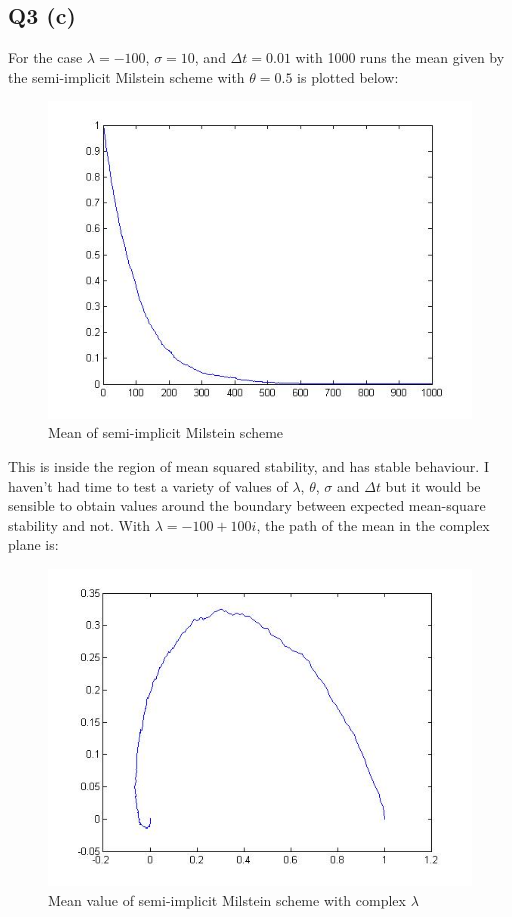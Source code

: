 \documentclass[11pt]{article} %
\begin{document}
\subsection{Q3 (c)}
For the case $\lambda = -100$, $\sigma = 10$, and $\Delta t = 0.01$ with 1000 runs the mean given by the semi-implicit Milstein scheme with $\theta = 0.5$ is plotted below:
\begin{figure}
	\centering
		\includegraphics[scale = 0.5]{q3_meanX}
		\caption{Mean of semi-implicit Milstein scheme}
\end{figure}
This is inside the region of mean squared stability, and has stable behaviour. I haven't had time to test a variety of values of $\lambda$, $\theta$, $\sigma$ and $\Delta t$ but it would be sensible to obtain values around the boundary between expected mean-square stability and not. With $\lambda = -100 + 100i$, the path of the mean in the complex plane is:
\begin{figure}
	\centering
		\includegraphics[scale = 0.5]{q3_meanCom}
		\caption{Mean value of semi-implicit Milstein scheme with complex $\lambda$}
\end{figure}
\end{document}
